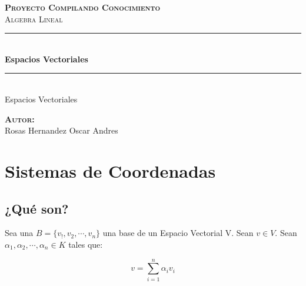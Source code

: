 \documentclass[12pt]{article}							    %
\author{Oscar Andrés Rosas}						            %
\begin{document}
\begin{titlepage}

	\center
	\textbf{\textsc{\Large Proyecto Compilando Conocimiento}}\\[1.0cm] 
	\textsc{\Large Algebra Lineal}\\[1.0cm] 

	\rule{\linewidth}{0.5mm} \\[1.0cm]
		{ \huge \bfseries Espacios Vectoriales}\\[1.0cm] 
	\rule{\linewidth}{0.5mm} \\[2.0cm]
	
	{\LARGE Espacios Vectoriales}\\[7cm] 
	
	\begin{center} \large
	\textbf{\textsc{Autor:}}\\
	Rosas Hernandez Oscar Andres
	\end{center}

	\vfill

\end{titlepage}






\section{Sistemas de Coordenadas}

\subsection{¿Qué son?}
Sea una $B = \{ v_!, v_2, \cdots, v_n\}$ una base de un Espacio Vectorial V.
Sean $v \in V$.
Sean $\alpha_1, \alpha_2, \cdots, \alpha_n \in K$ tales que:

\begin{equation}
    v = \sum_{i=1}^{n} \alpha_i v_i
\end{equation}
\end{document}
